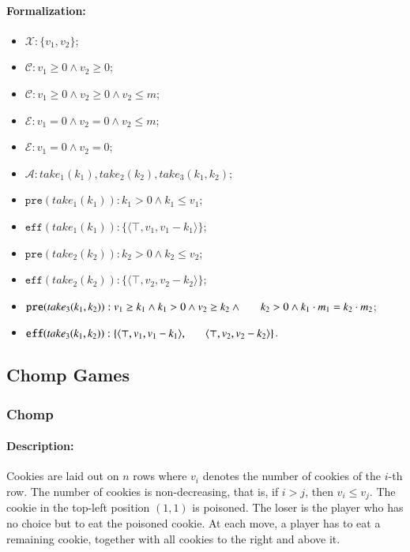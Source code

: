 \documentclass[review]{elsarticle}
\newcommand{\set}[1]{\{ #1 \}}
\newcommand{\tuple}[1]{\langle {#1} \rangle}
\newcommand{\true}{\top}
\newcommand{\statevar}{\mathcal{X}}
\newcommand{\act}{\mathcal{A}}
\newcommand{\constraint}{\mathcal{C}}
\newcommand{\estate}{\mathcal{E}}
\newcommand{\pre}{\mathtt{pre}}
\newcommand{\eff}{\mathtt{eff}}
\begin{document}
\paragraph{Formalization:}
\begin{itemize}
	\item $\statevar: \set{v_1, v_2}$;
	\item $\constraint: v_1 \ge 0 \wedge  v_2 \ge 0$;
	\item {\color{red}$\constraint: v_1 \ge 0 \wedge v_2 \ge 0 \wedge v_2 \le m$;}
	\item $\estate: v_1 = 0\wedge v_2 = 0 \wedge v_2 \le m$;
	\item {\color{red}$\estate: v_1 = 0 \wedge v_2 = 0$;}
	\item $\act:take_1(k_1), take_2(k_2), take_3(k_1,k_2)$;
	\item $\pre(take_1(k_1)) :  k_1 > 0 \wedge k_1 \le v_1$;
	\item $\eff(take_1(k_1)) : \set{\tuple{\true, v_1, v_1-k_1}}$;
	\item $\pre(take_2(k_2)) :  k_2 > 0 \wedge k_2 \le v_2$;
	\item $\eff(take_2(k_2)) : \set{\tuple{\true, v_2, v_2-k_2}}$;
	\item $\pre(take_3(k_1, k_2)) : v_1 \ge k_1 \wedge  k_1 > 0 \wedge v_2 \ge k_2 \wedge \\ \hspace*{6mm}
	k_2 > 0 \wedge k_1\cdot m_1= k_2 \cdot m_2$;
	\item $\eff(take_3(k_1,k_2)) : \set{\tuple{\true, v_1, v_1 -k_1}, \\ \hspace*{6mm}
		\tuple{\true, v_2, v_2 - k_2}}$.
\end{itemize}

\subsection{Chomp Games}
\subsubsection{Chomp \protect\cite{Sch1952}}

\paragraph{Description:}  
Cookies are laid out on $n$ rows where $v_i$ denotes the number of cookies of the $i$-th row.
The number of cookies is non-decreasing, that is, if $i > j$, then $v_i \leq v_j$.
The cookie in the top-left position $(1, 1)$ is poisoned.
The loser is the player who has no choice but to eat the poisoned cookie.
At each move, a player has to eat a remaining cookie, together with all cookies to the right and above it. 
\end{document}
